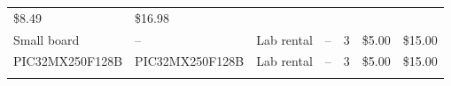 \documentclass[]{article}
\begin{document}
\begin{longtable}[]{@{}lllllll@{}}
\begin{minipage}[t]{0.06\columnwidth}
\$8.49\strut
\end{minipage} & \begin{minipage}[t]{0.07\columnwidth}\raggedright
\$16.98\strut
\end{minipage}\tabularnewline
\begin{minipage}[t]{0.15\columnwidth}\raggedright
Small board\strut
\end{minipage} & \begin{minipage}[t]{0.15\columnwidth}\raggedright
--\strut
\end{minipage} & \begin{minipage}[t]{0.10\columnwidth}\raggedright
Lab rental\strut
\end{minipage} & \begin{minipage}[t]{0.17\columnwidth}\raggedright
--\strut
\end{minipage} & \begin{minipage}[t]{0.11\columnwidth}\raggedright
3\strut
\end{minipage} & \begin{minipage}[t]{0.06\columnwidth}\raggedright
\$5.00\strut
\end{minipage} & \begin{minipage}[t]{0.07\columnwidth}\raggedright
\$15.00\strut
\end{minipage}\tabularnewline
\begin{minipage}[t]{0.15\columnwidth}\raggedright
PIC32MX250F128B\strut
\end{minipage} & \begin{minipage}[t]{0.15\columnwidth}\raggedright
PIC32MX250F128B\strut
\end{minipage} & \begin{minipage}[t]{0.10\columnwidth}\raggedright
Lab rental\strut
\end{minipage} & \begin{minipage}[t]{0.17\columnwidth}\raggedright
--\strut
\end{minipage} & \begin{minipage}[t]{0.11\columnwidth}\raggedright
3\strut
\end{minipage} & \begin{minipage}[t]{0.06\columnwidth}\raggedright
\$5.00\strut
\end{minipage} & \begin{minipage}[t]{0.07\columnwidth}\raggedright
\$15.00\strut
\end{minipage}\tabularnewline
\begin{minipage}[t]{0.15\columnwidth}\raggedright

\end{minipage}
\end{longtable}
\end{document}
